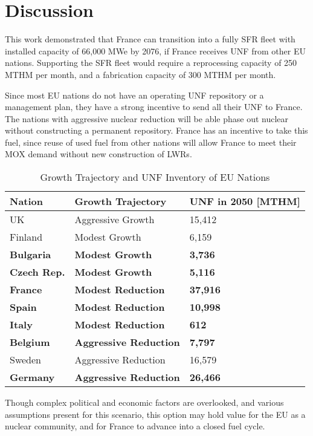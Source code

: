 \section{Discussion}
This work demonstrated that France can transition into
a fully \gls{SFR} fleet with installed capacity of 66,000 MWe by 2076,
if France receives \gls{UNF} from other \gls{EU} nations.
Supporting the \gls{SFR} fleet would require a reprocessing capacity of 250 MTHM per month,
and a fabrication capacity of 300 MTHM per month.

Since most \gls{EU} nations do not have an operating \gls{UNF}
repository or a management plan, they have a strong incentive
to send all their \gls{UNF} to France. The nations
with aggressive nuclear reduction will be able phase out nuclear
without constructing a permanent repository. France has an
incentive to take this fuel, since reuse of used fuel from
other nations will allow France to meet their MOX demand
without new construction of \glspl{LWR}.

\begin{table}[h]
    \centering
                \begin{tabularx}{\textwidth}{lbb}
                    \hline 
                    
                    \textbf{Nation} & \textbf{Growth Trajectory} & \small{\textbf{UNF in 2050 [MTHM] }}\\
                    \hline
                    UK & Aggressive Growth & 15,412\\
                    \hline
                    Finland & Modest Growth & 6,159\\
                    \hline
                    \textbf{Bulgaria} & \textbf{Modest Growth} & \textbf{3,736}\\
                    \hline
                    \textbf{Czech Rep.} & \textbf{Modest Growth} & \textbf{5,116}\\
                    \hline
                    \textbf{France} & \textbf{Modest Reduction} & \textbf{37,916}\\
                    \hline
                    \textbf{Spain} & \textbf{Modest Reduction} &  \textbf{10,998}\\
                    \hline
                    \textbf{Italy} & \textbf{Modest Reduction} & \textbf{612}\\
                    \hline
                    \textbf{Belgium} & \textbf{Aggressive Reduction} & \textbf{7,797}\\
                    \hline
                    Sweden & Aggressive Reduction & 16,579\\
                    \hline
                    \textbf{Germany} & \textbf{Aggressive Reduction} & \textbf{26,466}\\
                    \hline
                    
                \end{tabularx}
    \caption {Growth Trajectory and UNF Inventory of \gls{EU} Nations}
    \label{tab:which_count}
\end{table}

Though complex political and economic factors are overlooked,
 and various assumptions present for this scenario,
this option may hold value for the \gls{EU} as a nuclear community,
and for France to advance into a closed fuel cycle.
